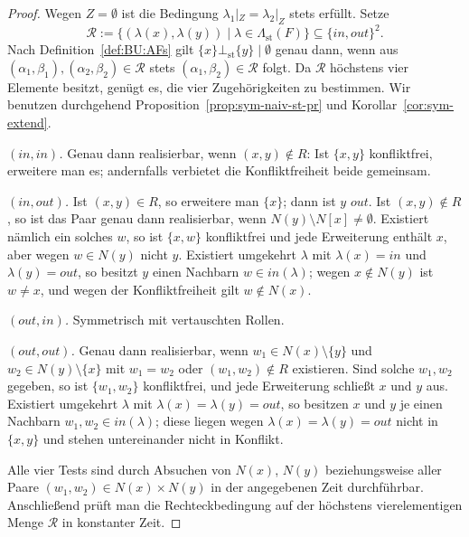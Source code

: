 \begin{proof}
    Wegen \(Z=\emptyset\) ist die Bedingung \(\lambda_1|_Z=\lambda_2|_Z\)
    stets erfüllt. Setze
    \[
        \mathcal{R}:=\bigl\{(\lambda(x),\lambda(y))\;\big|\;
        \lambda\in\Lambda_{\mathrm{st}}(F)\bigr\}
        \subseteq\{\mathit{in},\mathit{out}\}^2 .
    \]
    Nach Definition~\ref{def:BU:AFs} gilt
    \(\{x\}\bot_{\mathrm{st}}\{y\}\mid\emptyset\) genau dann, wenn aus
    \((\alpha_1,\beta_1),(\alpha_2,\beta_2)\in\mathcal{R}\) stets
    \((\alpha_1,\beta_2)\in\mathcal{R}\) folgt. Da \(\mathcal{R}\) höchstens
    vier Elemente besitzt, genügt es, die vier Zugehörigkeiten zu bestimmen.
    Wir benutzen durchgehend Proposition~\ref{prop:sym-naiv-st-pr} und
    Korollar~\ref{cor:sym-extend}.

    \emph{\((\mathit{in},\mathit{in})\).} Genau dann realisierbar, wenn
    \((x,y)\notin R\): Ist \(\{x,y\}\) konfliktfrei, erweitere man es; andernfalls
    verbietet die Konfliktfreiheit beide gemeinsam.

    \emph{\((\mathit{in},\mathit{out})\).} Ist \((x,y)\in R\), so erweitere man
    \(\{x\}\); dann ist \(y\) \(\mathit{out}\). Ist \((x,y)\notin R\), so ist
    das Paar genau dann realisierbar, wenn \(N(y)\setminus N[x]\neq\emptyset\).
    Existiert nämlich ein solches \(w\), so ist \(\{x,w\}\) konfliktfrei und
    jede Erweiterung enthält \(x\), aber wegen \(w\in N(y)\) nicht \(y\).
    Existiert umgekehrt \(\lambda\) mit \(\lambda(x)=\mathit{in}\) und
    \(\lambda(y)=\mathit{out}\), so besitzt \(y\) einen Nachbarn
    \(w\in\mathit{in}(\lambda)\); wegen \(x\notin N(y)\) ist \(w\neq x\), und
    wegen der Konfliktfreiheit gilt \(w\notin N(x)\).

    \emph{\((\mathit{out},\mathit{in})\).} Symmetrisch mit vertauschten Rollen.

    \emph{\((\mathit{out},\mathit{out})\).} Genau dann realisierbar, wenn
    \(w_1\in N(x)\setminus\{y\}\) und \(w_2\in N(y)\setminus\{x\}\) mit
    \(w_1=w_2\) oder \((w_1,w_2)\notin R\) existieren. Sind solche \(w_1,w_2\)
    gegeben, so ist \(\{w_1,w_2\}\) konfliktfrei, und jede Erweiterung schließt
    \(x\) und \(y\) aus. Existiert umgekehrt \(\lambda\) mit
    \(\lambda(x)=\lambda(y)=\mathit{out}\), so besitzen \(x\) und \(y\) je einen
    Nachbarn \(w_1,w_2\in\mathit{in}(\lambda)\); diese liegen wegen
    \(\lambda(x)=\lambda(y)=\mathit{out}\) nicht in \(\{x,y\}\) und stehen
    untereinander nicht in Konflikt.

    Alle vier Tests sind durch Absuchen von \(N(x)\), \(N(y)\) beziehungsweise
    aller Paare \((w_1,w_2)\in N(x)\times N(y)\) in der angegebenen Zeit
    durchführbar. Anschließend prüft man die Rechteckbedingung auf der höchstens
    vierelementigen Menge \(\mathcal{R}\) in konstanter Zeit.
\end{proof}

